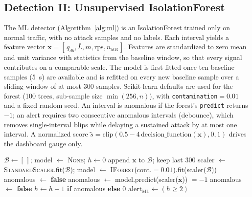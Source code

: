 \documentclass[preprint,12pt]{elsarticle}
\begin{document}
\subsection{Detection II: Unsupervised IsolationForest}
\label{sec:design-ml}
The ML detector (Algorithm~\ref{alg:ml}) is an IsolationForest \cite{liu2008} trained
only on normal traffic, with no attack samples and no labels. Each interval yields a
feature vector $\mathbf{x}=[\,q_{db}, \bar{L}, m, \text{rps}, n_{503}\,]$. Features
are standardized to zero mean and unit variance with statistics from the baseline
window, so that every signal contributes on a comparable scale. The model is first
fitted once ten baseline samples (5~s) are available and is refitted on every new
baseline sample over a sliding window of at most 300 samples. Scikit-learn defaults
are used for the forest (100 trees, sub-sample size $\min(256,n)$), with
\texttt{contamination}$=0.01$ and a fixed random seed. An interval is anomalous if the
forest's \texttt{predict} returns $-1$; an alert requires two consecutive anomalous
intervals (debounce), which removes single-interval blips while delaying a sustained
attack by at most one interval. A normalized score
$\tilde s = \mathrm{clip}(0.5 - 4\,\mathrm{decision\_function}(\mathbf{x}), 0, 1)$ drives
the dashboard gauge only.

\begin{algorithm}[t]
\caption{Online IsolationForest detector}
\label{alg:ml}
\begin{algorithmic}[1]
\State $\mathcal{B} \gets [\,]$; model $\gets$ \textsc{None}; $h \gets 0$
    \State append $\mathbf{x}$ to $\mathcal{B}$; keep last 300
     \State scaler $\gets$ \textsc{StandardScaler}.fit($\mathcal{B}$); model $\gets$ \textsc{IForest}(cont.$=0.01$).fit(scaler($\mathcal{B}$)) \EndIf
  \EndIf
   \State anomalous $\gets$ \textbf{false}
  \Else \State anomalous $\gets$ model.predict(scaler($\mathbf{x}$)) $= -1$ \EndIf
   \State anomalous $\gets$ \textbf{false} \EndIf
  \State $h \gets h+1$ \textbf{if} anomalous \textbf{else} $0$
  \State $\mathrm{alert}_{\mathrm{ML}} \gets (h \ge 2)$
\EndFor
\end{algorithmic}
\end{algorithm}
\end{document}

